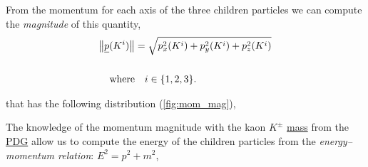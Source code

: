 From the momentum for each axis of the three children particles we can compute the \emph{magnitude} of this quantity,
\begin{align}
   \norm {\underline{p}(K^i)} &= \sqrt{ p_{x}^2(K^i) + p_{y}^2(K^i) + p_{z}^2 (K^i)} \\ \notag\\
   \text{where} &\quad i \in \{1,2,3\}\text{.} \notag
\end{align}

that has the following distribution (\autoref{fig:mom_mag}),

\begin{figure}[H]
	\centering
	\caption{} %
	\label{fig:mom_mag}
\end{figure}

The knowledge of the momentum magnitude with the kaon $K^{\pm}$ \href{https://pdglive.lbl.gov/Particle.action?node=S010&home=sumtabM}{mass} from the \href{https://pdglive.lbl.gov/Viewer.action}{PDG} \cite{PDG} allow us to compute the energy of the children particles from the \emph{energy–momentum relation}: $E^2 = p^2 +m^2$,

